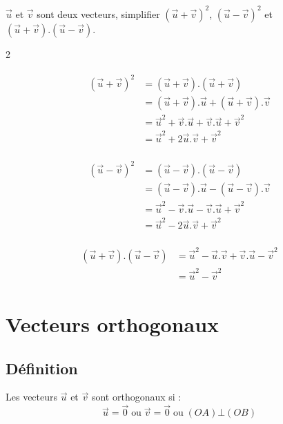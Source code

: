 \documentclass[french]{book}
\newcommand{\vect}[1]{\overrightarrow{#1}}
\begin{document}
\newpage
\begin{exemple}
$\vect{u}$ et $\vect{v}$ sont deux vecteurs, simplifier $\left(\vect{u}+\vect{v}\right)^{2}$, $\left(\vect{u}-\vect{v}\right)^{2}$ et $\left(\vect{u}+\vect{v}\right).\left(\vect{u}-\vect{v}\right)$.

\begin{multicols}{2}

\begin{align*}
\begin{split}
\left(\vect{u}+\vect{v}\right)^{2}&=\left(\vect{u}+\vect{v}\right).\left(\vect{u}+\vect{v}\right)\\
&=\left(\vect{u}+\vect{v}\right).\vect{u}+\left(\vect{u}+\vect{v}\right).\vect{v}\\
&=\vect{u}^2 + \vect{v}.\vect{u} + \vect{v}.\vect{u} + \vect{v}^2 \\
&= \vect{u}^2 +  2\vect{u}.\vect{v} + \vect{v}^2
\end{split}
\end{align*}

\begin{align*}
\begin{split}
\left(\vect{u}-\vect{v}\right)^{2}&=\left(\vect{u}-\vect{v}\right).\left(\vect{u}-\vect{v}\right)\\
&=\left(\vect{u}-\vect{v}\right).\vect{u}-\left(\vect{u}-\vect{v}\right).\vect{v}\\
&=\vect{u}^2 - \vect{v}.\vect{u} - \vect{v}.\vect{u} + \vect{v}^2 \\
&= \vect{u}^2 -  2\vect{u}.\vect{v} + \vect{v}^2
\end{split}
\end{align*}
\end{multicols}

\begin{align*}
\begin{split}
\left(\vect{u}+\vect{v}\right).\left(\vect{u}-\vect{v}\right)&=\vect{u}^2 - \vect{u}.\vect{v} + \vect{v}.\vect{u} - \vect{v}^2 \\&= \vect{u}^2 - \vect{v}^2
\end{split}
\end{align*}
\end{exemple}

\section{Vecteurs orthogonaux}
\subsection{D\'efinition}
\begin{defn}
Les vecteurs $\vect{u}$ et $\vect{v}$ sont orthogonaux si :
\[\vect{u}=\vect{0} \; \text{ou} \; \vect{v}=\vect{0} \; \text{ou} \; (OA)\bot(OB)\]
\end{defn}
\end{document}
